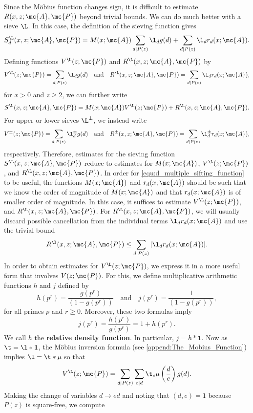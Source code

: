     Since the M\"obius function changes sign, it is difficult to estimate $R(x,z;\mc{A},\mc{P})$ beyond trivial bounds. We can do much better with a sieve $\L$. In this case, the definition of the sieving function gives
    \[
      S_{d}^{\L}(x,z;\mc{A},\mc{P}) = M(x;\mc{A})\sum_{d \mid P(z)}\l_{d}g(d)+\sum_{d \mid P(z)}\l_{d}r_{d}(x;\mc{A}).
    \]
    Defining functions $V^{\L}(z;\mc{P})$ and $R^{\L}(x,z;\mc{A},\mc{P})$ by
     \[
      V^{\L}(z;\mc{P}) = \sum_{d \mid P(z)}\l_{d}g(d) \quad \text{and} \quad R^{\L}(x,z;\mc{A},\mc{P}) = \sum_{d \mid P(z)}\l_{d}r_{d}(x;\mc{A}),
    \]
    for $x > 0$ and $z \ge 2$, we can further write
    \[
      S^{\L}(x,z;\mc{A},\mc{P}) = M(x;\mc{A})V^{\L}(z;\mc{P})+R^{\L}(x,z;\mc{A},\mc{P}).
    \]
    For upper or lower sieves $\L^{\pm}$, we instead write
     \[
      V^{\pm}(z;\mc{P}) = \sum_{d \mid P(z)}\l_{d}^{\pm}g(d) \quad \text{and} \quad R^{\pm}(x,z;\mc{A},\mc{P}) = \sum_{d \mid P(z)}\l_{d}^{\pm}r_{d}(x;\mc{A}),
    \]
    respectively. Therefore, estimates for the sieving function $S^{\L}(x,z;\mc{A},\mc{P})$ reduce to estimates for $M(x;\mc{A})$, $V^{\L}(z;\mc{P})$, and $R^{\L}(x,z;\mc{A},\mc{P})$. In order for \cref{equ:d_multiple_sifting_function} to be useful, the functions $M(x;\mc{A})$ and $r_{d}(x;\mc{A})$ should be such that we know the order of magnitude of $M(x;\mc{A})$ and that $r_{d}(x;\mc{A})$ is of smaller order of magnitude. In this case, it suffices to estimate $V^{\L}(z;\mc{P})$, and $R^{\L}(x,z;\mc{A},\mc{P})$. For $R^{\L}(x,z;\mc{A},\mc{P})$, we will usually discard possible cancellation from the individual terms $\l_{d}r_{d}(x;\mc{A})$ and use the trivial bound
    \[
      R^{\l}(x,z;\mc{A},\mc{P}) \le \sum_{d \mid P(z)}|\l_{d}r_{d}(x;\mc{A})|.
    \]
    In order to obtain estimates for $V^{\L}(z;\mc{P})$, we express it in a more useful form that involves $V(z;\mc{P})$. For this, we define multiplicative arithmetic functions $h$ and $j$ defined by
    \[
      h(p^{r}) = \frac{g(p^{r})}{(1-g(p^{r}))} \quad \text{and} \quad j(p^{r}) = \frac{1}{(1-g(p^{r}))},
    \]
    for all primes $p$ and $r \ge 0$. Moreover, these two formulas imply
    \[
      j(p^{r}) = \frac{h(p^{r})}{g(p^{r})} = 1+h(p^{r}).
    \]
    We call $h$ the \textbf{relative density function}. In particular, $j = h \ast \mathbf{1}$. Now as $\t = \l \ast \mathbf{1}$, the M\"obius inversion formula (see \cref{append:The_Mobius_Function}) implies $\l = \t \ast \mu$ so that
    \[
      V^{\L}(z;\mc{P}) = \sum_{d \mid P(z)}\sum_{e \mid d}\t_{e}\mu\left(\frac{d}{e}\right)g(d).
    \]
    Making the change of variables $d \to ed$ and noting that $(d,e) = 1$ because $P(z)$ is square-free, we compute
